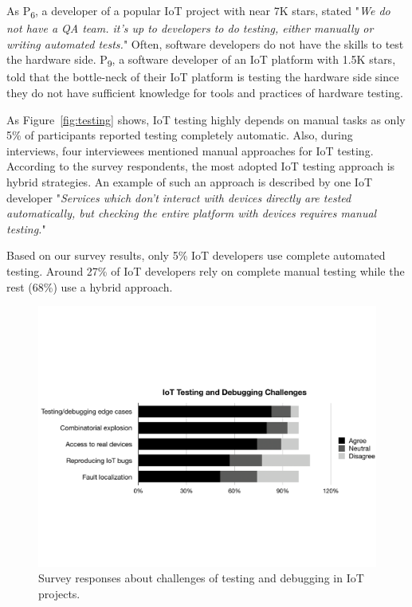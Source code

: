 {As P\textsubscript{6}, a developer of a popular IoT project with near 7K stars, stated "\emph{We do not have a QA team. it's up to developers to do testing, either manually or writing automated tests.}" Often, software developers do not have the skills to test the hardware side. P\textsubscript{9}, a software developer of an IoT platform with 1.5K stars, told that the bottle-neck of their IoT platform is testing the hardware side since they do not have sufficient knowledge for tools and practices of hardware testing.

As Figure~\ref{fig:testing} shows, IoT testing highly depends on manual tasks as only 5\% of participants reported testing completely automatic. Also, during interviews, four interviewees mentioned manual approaches for IoT testing. According to the survey respondents, the most adopted IoT testing approach is hybrid strategies. An example of such an approach is described by one IoT developer "\emph{Services which don't interact with devices directly are tested automatically, but checking the entire platform with devices requires manual testing.}" 

Based on our survey results, only 5\% IoT developers use complete automated testing. Around 27\% of IoT developers rely on complete manual testing while the rest (68\%) use a hybrid approach. 


 \begin{figure}%
  \centering
   \includegraphics[width=\linewidth]{imgs/survey1}
  \caption{Survey responses about challenges of testing and debugging in IoT projects.}
  \label{fig:survey1}
\end{figure}


}
